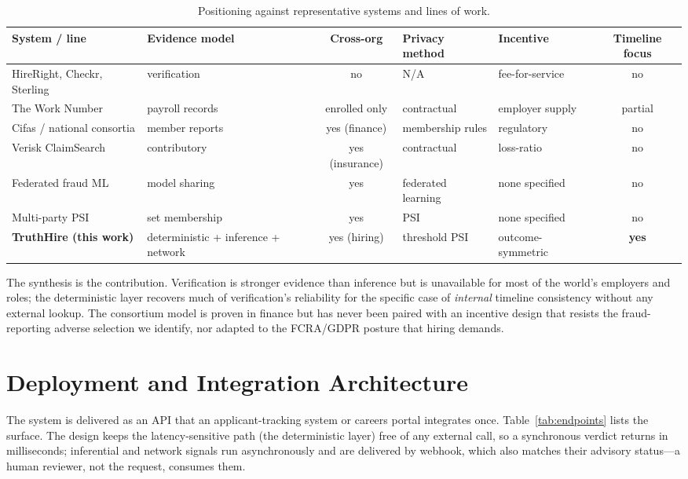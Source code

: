 \documentclass[11pt]{article}
\begin{document}
\begin{table}[t]\centering\small
\caption{Positioning against representative systems and lines of work.}\label{tab:systems}
\begin{tabular}{p{2.6cm}p{2.2cm}cp{2.0cm}p{2.0cm}c}
\toprule
System / line & Evidence model & Cross-org & Privacy method & Incentive & Timeline focus\\
\midrule
HireRight, Checkr, Sterling & verification & no & N/A & fee-for-service & no\\
The Work Number & payroll records & enrolled only & contractual & employer supply & partial\\
Cifas / national consortia & member reports & yes (finance) & membership rules & regulatory & no\\
Verisk ClaimSearch & contributory & yes (insurance) & contractual & loss-ratio & no\\
Federated fraud ML~\cite{starlit2024} & model sharing & yes & federated learning & none specified & no\\
Multi-party PSI~\cite{otpsi2026} & set membership & yes & PSI & none specified & no\\
\textbf{TruthHire (this work)} & deterministic + inference + network & yes (hiring) & threshold PSI & outcome-symmetric & \textbf{yes}\\
\bottomrule
\end{tabular}
\end{table}

The synthesis is the contribution. Verification is stronger evidence than
inference but is unavailable for most of the world's employers and roles; the
deterministic layer recovers much of verification's reliability for the specific
case of \emph{internal} timeline consistency without any external lookup. The
consortium model is proven in finance but has never been paired with an
incentive design that resists the fraud-reporting adverse selection we identify,
nor adapted to the FCRA/GDPR posture that hiring demands.

\section{Deployment and Integration Architecture}\label{sec:deploy}
The system is delivered as an API that an applicant-tracking system or careers
portal integrates once. Table~\ref{tab:endpoints} lists the surface. The design
keeps the latency-sensitive path (the deterministic layer) free of any external
call, so a synchronous verdict returns in milliseconds; inferential and network
signals run asynchronously and are delivered by webhook, which also matches their
advisory status---a human reviewer, not the request, consumes them.
\end{document}
